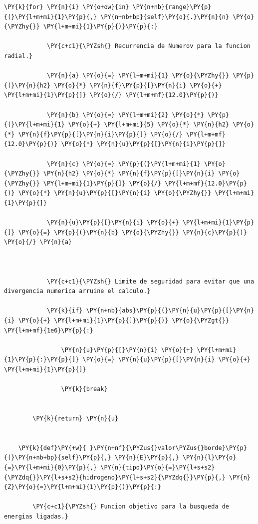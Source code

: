 \documentclass[11pt]{article}
\makeatletter
\def\PY@reset{\let\PY@it=\relax \let\PY@bf=\relax \let\PY@ul=\relax \let\PY@tc=\relax \let\PY@bc=\relax \let\PY@ff=\relax}
\def\PY@tok#1{\csname PY@tok@#1\endcsname}
\def\PY@toks#1+{\ifx\relax#1\empty\else \PY@tok{#1}\expandafter\PY@toks\fi}
\def\PY@do#1{\PY@bc{\PY@tc{\PY@ul{\PY@it{\PY@bf{\PY@ff{#1}}}}}}}
\def\PY#1#2{\PY@reset\PY@toks#1+\relax+\PY@do{#2}}
\makeatother
\begin{document}
\begin{tcolorbox}[breakable, size=fbox, boxrule=1pt, pad at break*=1mm,colback=cellbackground, colframe=cellborder]
\begin{Verbatim}[commandchars=\\\{\}]
        \PY{k}{for} \PY{n}{i} \PY{o+ow}{in} \PY{n+nb}{range}\PY{p}{(}\PY{l+m+mi}{1}\PY{p}{,} \PY{n+nb+bp}{self}\PY{o}{.}\PY{n}{n} \PY{o}{\PYZhy{}} \PY{l+m+mi}{1}\PY{p}{)}\PY{p}{:}

            \PY{c+c1}{\PYZsh{} Recurrencia de Numerov para la funcion radial.}

            \PY{n}{a} \PY{o}{=} \PY{l+m+mi}{1} \PY{o}{\PYZhy{}} \PY{p}{(}\PY{n}{h2} \PY{o}{*} \PY{n}{f}\PY{p}{[}\PY{n}{i} \PY{o}{+} \PY{l+m+mi}{1}\PY{p}{]} \PY{o}{/} \PY{l+m+mf}{12.0}\PY{p}{)}

            \PY{n}{b} \PY{o}{=} \PY{l+m+mi}{2} \PY{o}{*} \PY{p}{(}\PY{l+m+mi}{1} \PY{o}{+} \PY{l+m+mi}{5} \PY{o}{*} \PY{n}{h2} \PY{o}{*} \PY{n}{f}\PY{p}{[}\PY{n}{i}\PY{p}{]} \PY{o}{/} \PY{l+m+mf}{12.0}\PY{p}{)} \PY{o}{*} \PY{n}{u}\PY{p}{[}\PY{n}{i}\PY{p}{]}

            \PY{n}{c} \PY{o}{=} \PY{p}{(}\PY{l+m+mi}{1} \PY{o}{\PYZhy{}} \PY{n}{h2} \PY{o}{*} \PY{n}{f}\PY{p}{[}\PY{n}{i} \PY{o}{\PYZhy{}} \PY{l+m+mi}{1}\PY{p}{]} \PY{o}{/} \PY{l+m+mf}{12.0}\PY{p}{)} \PY{o}{*} \PY{n}{u}\PY{p}{[}\PY{n}{i} \PY{o}{\PYZhy{}} \PY{l+m+mi}{1}\PY{p}{]}

            \PY{n}{u}\PY{p}{[}\PY{n}{i} \PY{o}{+} \PY{l+m+mi}{1}\PY{p}{]} \PY{o}{=} \PY{p}{(}\PY{n}{b} \PY{o}{\PYZhy{}} \PY{n}{c}\PY{p}{)} \PY{o}{/} \PY{n}{a}

            

            \PY{c+c1}{\PYZsh{} Limite de seguridad para evitar que una divergencia numerica arruine el calculo.}

            \PY{k}{if} \PY{n+nb}{abs}\PY{p}{(}\PY{n}{u}\PY{p}{[}\PY{n}{i} \PY{o}{+} \PY{l+m+mi}{1}\PY{p}{]}\PY{p}{)} \PY{o}{\PYZgt{}} \PY{l+m+mf}{1e6}\PY{p}{:}

                \PY{n}{u}\PY{p}{[}\PY{n}{i} \PY{o}{+} \PY{l+m+mi}{1}\PY{p}{:}\PY{p}{]} \PY{o}{=} \PY{n}{u}\PY{p}{[}\PY{n}{i} \PY{o}{+} \PY{l+m+mi}{1}\PY{p}{]}

                \PY{k}{break}


        \PY{k}{return} \PY{n}{u}


    \PY{k}{def}\PY{+w}{ }\PY{n+nf}{\PYZus{}valor\PYZus{}borde}\PY{p}{(}\PY{n+nb+bp}{self}\PY{p}{,} \PY{n}{E}\PY{p}{,} \PY{n}{l}\PY{o}{=}\PY{l+m+mi}{0}\PY{p}{,} \PY{n}{tipo}\PY{o}{=}\PY{l+s+s2}{\PYZdq{}}\PY{l+s+s2}{hidrogeno}\PY{l+s+s2}{\PYZdq{}}\PY{p}{,} \PY{n}{Z}\PY{o}{=}\PY{l+m+mi}{1}\PY{p}{)}\PY{p}{:}

        \PY{c+c1}{\PYZsh{} Funcion objetivo para la busqueda de energias ligadas.}


\end{Verbatim}
\end{tcolorbox}
\end{document}
